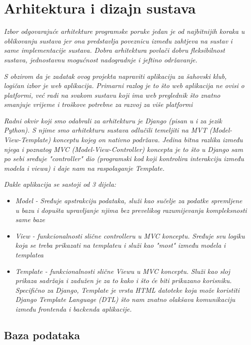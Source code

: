 \chapter{Arhitektura i dizajn sustava}
		\textit{ Izbor odgovarajuće arhitekture programske poruke jedan je od najbitnijih koraka u oblikovanju sustava jer ona predstavlja poveznicu između zahtjeva na sustav i same implementacije sustava. Dobra arhitektura povlači dobru fleksibilnost sustava, jednostavnu mogućnost nadogradnje i jeftino održavanje.}
		
		\textit{ S obzirom da je zadatak ovog projekta napraviti aplikaciju za šahovski klub, logičan izbor je web aplikacija. Primarni razlog je to što web aplikacija ne ovisi o platformi, već radi na svakom sustavu koji ima web preglednik što znatno smanjuje vrijeme i troškove potrebne za razvoj za više platformi}
		
		\textit{ Radni okvir koji smo odabrali za arhitekturu je Django (pisan u i za jezik Python). S njime smo arhitekturu sustava odlučili temeljiti na MVT (Model-View-Template) konceptu kojeg on nativno podržava. Jedina bitna razlika između njega i poznatog MVC (Model-View-Controller) koncepta je to što u Django sam po sebi sređuje "controller" dio (programski kod koji kontrolira interakciju između modela i viewa) i daje nam na raspolaganje Template.}
		
		\textit{ Dakle aplikacija se sastoji od 3 dijela: }
		\begin{itemize}
			\item 	\textit{Model - Sređuje apstrakciju podataka, služi kao sučelje za podatke spremljene u bazu i dopušta upravljanje njima bez prevelikog razumijevanja kompleksnosti same baze }
			\item 	\textit{View - funkcionalnosti slične controlleru u MVC konceptu. Sređuje svu logiku koja se treba prikazati na templateu i služi kao "most" između modela i templatea}
			\item 	\textit{Template - funkcionalnosti slične Viewu u MVC konceptu. Služi kao sloj prikaza sadržaja i zadužen je za to kako i što će biti prikazano korisniku. Specifično za Django, Template je vrsta HTML datoteke koja može koristiti Django Template Language (DTL) što nam znatno olakšava komunikaciju između frontenda i backenda aplikacije.}		
		\end{itemize}
		

				
		\section{Baza podataka}
			
